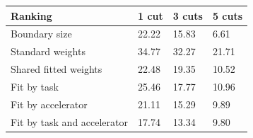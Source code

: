 \begin{tabular}{@{}llll@{}}
\toprule
Ranking & 1 cut & 3 cuts & 5 cuts \\
\midrule
Boundary size & 22.22 & 15.83 & 6.61 \\
Standard weights & 34.77 & 32.27 & 21.71 \\
Shared fitted weights & 22.48 & 19.35 & 10.52 \\
Fit by task & 25.46 & 17.77 & 10.96 \\
Fit by accelerator & 21.11 & 15.29 & 9.89 \\
Fit by task and accelerator & 17.74 & 13.34 & 9.80 \\
\bottomrule
\end{tabular}
